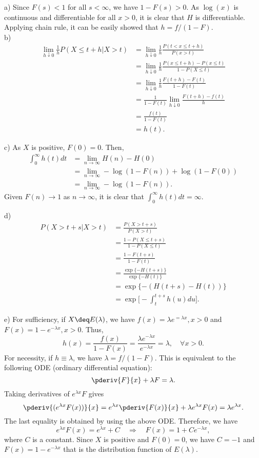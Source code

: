\begin{solution}
  a) Since $F(s)<1$ for all $s<\infty$, we have $1-F(s)>0$. As $\log(x)$ is continuous and differentiable for all $x>0$, it is clear that $H$ is differentiable. Applying chain rule, it can be easily showed that $h=f/(1-F)$. \\

  b) \begin{align*}
    \lim_{h\downarrow 0}\frac{1}{h}P(X\leq t+h|X>t) &= \lim_{h\downarrow 0}\frac{1}{h}\frac{P(t<x\leq t+h)}{P(x>t)} \\
      &= \lim_{h\downarrow 0}\frac{1}{h}\frac{P(x\leq t+h) - P(x\leq t)}{1-P(X\leq t)} \\
      &= \lim_{h\downarrow 0}\frac{1}{h}\frac{F(t+h)-F(t)}{1-F(t)} \\
      &= \frac{1}{1-F(t)}\lim_{h\downarrow 0} \frac{F(t+h)-f(t)}{h} \\
      &= \frac{f(t)}{1-F(t)} \\
      &= h(t).
  \end{align*}

  c) As $X$ is positive, $F(0)=0$. Then,
  \begin{align*}
    \int_0^\infty h(t)dt &= \lim_{n\to\infty} H(n) - H(0) \\
      &= \lim_{n\to\infty} -\log(1-F(n)) + \log(1-F(0)) \\
      &= \lim_{n\to\infty} -\log(1-F(n)) .
  \end{align*}
  Given $F(n)\to 1$ as $n\to\infty$, it is clear that $\int_0^\infty h(t)dt=\infty$.

  d) \begin{align*}
    P(X>t+s|X>t) &= \frac{P(X>t+s)}{P(X>t)} \\
      &= \frac{1 - P(X\leq t+s)}{1 - P(X\leq t)} \\
      &= \frac{1 - F(t+s)}{1 - F(t)} \\
      &= \frac{\exp\{-H(t+s)\}}{\exp\{-H(t)\}} \\
      &= \exp\{-(H(t+s)-H(t))\} \\
      &= \exp\bigg[ -\int_t^{t+s}h(u)du \bigg] .
  \end{align*}

  e) For sufficiency, if $X\deq E(\lambda)$, we have $f(x)=\lambda e^{=\lambda x}, x>0$ and $F(x)=1-e^{-\lambda x}, x>0$. Thus,
  \[h(x) = \frac{f(x)}{1-F(x)} = \frac{\lambda e^{-\lambda x}}{e^{-\lambda x}} = \lambda, \quad \forall x>0 .\]
  For necessity, if $h\equiv \lambda$, we have $\lambda = f/(1-F)$. This is equivalent to the following ODE (ordinary differential equation):
  \[ \pderiv{F}{x} + \lambda F = \lambda . \]
  Taking derivatives of $e^{\lambda x}F$ gives
  \[ \pderiv{(e^{\lambda x}F(x))}{x} = e^{\lambda x}\pderiv{F(x)}{x} + \lambda e^{\lambda x}F(x) = \lambda e^{\lambda x}.\]
  The last equality is obtained by using the above ODE. Therefore, we have
  \[ e^{\lambda x}F(x) = e^{\lambda x} + C \quad\Rightarrow\quad F(x) = 1 + Ce^{-\lambda x} ,\]
  where $C$ is a constant. Since $X$ is positive and $F(0)=0$, we have $C=-1$ and $F(x)=1-e^{-\lambda x}$ that is the distribution function of $E(\lambda)$.
\end{solution}
